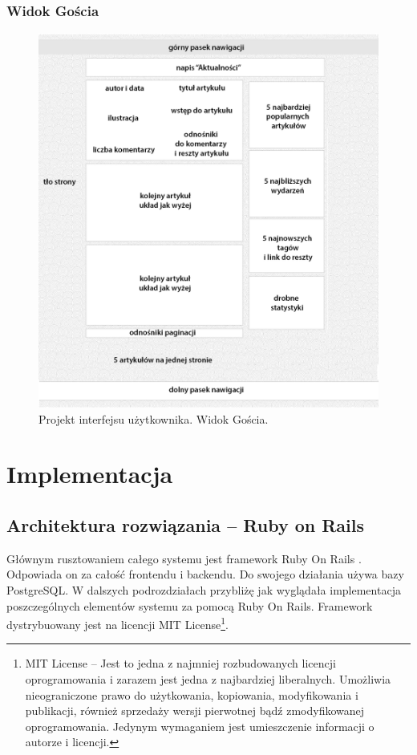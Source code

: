 \documentclass[openright]{xmgr}
\begin{document}
\newpage

\subsection{Widok Gościa}
\begin{figure}[!tbh]
\centering
\includegraphics[width=.9\linewidth]{fig/gui_guest}
\caption{Projekt interfejsu użytkownika. Widok Gościa.}
\end{figure}

\chapter{Implementacja}

\section{Architektura rozwiązania -- Ruby on Rails}
Głównym rusztowaniem całego systemu jest framework Ruby On Rails \cite{ror} \cite{enterprise} \cite{wikibook} \cite{guides}. Odpowiada on za całość frontendu i backendu. Do swojego działania używa bazy PostgreSQL. W dalszych podrozdziałach przybliżę jak wyglądała implementacja poszczególnych elementów systemu za pomocą Ruby On Rails. Framework dystrybuowany jest na licencji MIT License\footnote{MIT License -- Jest to jedna z najmniej rozbudowanych licencji oprogramowania i zarazem jest jedna z najbardziej liberalnych. Umożliwia nieograniczone prawo do użytkowania, kopiowania, modyfikowania i publikacji, również sprzedaży wersji pierwotnej bądź zmodyfikowanej oprogramowania. Jedynym wymaganiem jest umieszczenie informacji o autorze i licencji.}.
\end{document}
